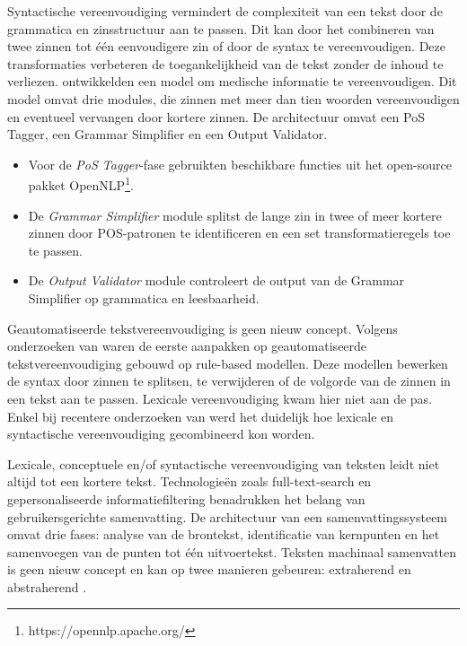 \medspace

Syntactische vereenvoudiging vermindert de complexiteit van een tekst door de grammatica en zinsstructuur aan te passen. Dit kan door het combineren van twee zinnen tot één eenvoudigere zin of door de syntax te vereenvoudigen. Deze transformaties verbeteren de toegankelijkheid van de tekst zonder de inhoud te verliezen. \textcite{Kandula2010} ontwikkelden een model om medische informatie te vereenvoudigen. Dit model omvat drie modules, die zinnen met meer dan tien woorden vereenvoudigen en eventueel vervangen door kortere zinnen. De architectuur omvat een PoS Tagger, een Grammar Simplifier en een Output Validator.

\begin{itemize}
	\item Voor de \textit{PoS Tagger}-fase gebruikten \textcite{Kandula2010} beschikbare functies uit het open-source pakket OpenNLP\footnote{https://opennlp.apache.org/}.
	\item De \textit{Grammar Simplifier} module splitst de lange zin in twee of meer kortere zinnen door POS-patronen te identificeren en een set transformatieregels toe te passen.
	\item De \textit{Output Validator} module controleert de output van de Grammar Simplifier op grammatica en leesbaarheid.
\end{itemize}  

\medspace

Geautomatiseerde tekstvereenvoudiging is geen nieuw concept. Volgens onderzoeken van \textcite{Canning2000, Siddharthan2006} waren de eerste aanpakken op geautomatiseerde tekstvereenvoudiging gebouwd op rule-based modellen. Deze modellen bewerken de syntax door zinnen te splitsen, te verwijderen of de volgorde van de zinnen in een tekst aan te passen. Lexicale vereenvoudiging kwam hier niet aan de pas. Enkel bij recentere onderzoeken van \textcite{Coster2011, Bulte2018} werd het duidelijk hoe lexicale en syntactische vereenvoudiging gecombineerd kon worden.

\medspace

Lexicale, conceptuele en/of syntactische vereenvoudiging van teksten leidt niet altijd tot een kortere tekst. Technologieën zoals full-text-search en gepersonaliseerde informatiefiltering benadrukken het belang van gebruikersgerichte samenvatting. De architectuur van een samenvattingssysteem omvat drie fases: analyse van de brontekst, identificatie van kernpunten en het samenvoegen van de punten tot één uitvoertekst. Teksten machinaal samenvatten is geen nieuw concept en kan op twee manieren gebeuren: extraherend en abstraherend \autocite{Hahn2000, Dubay2004}.

